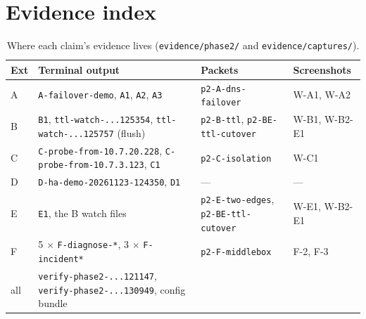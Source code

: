 \documentclass[11pt,a4paper]{article}
\begin{document}
\section{Evidence index}
\begin{table}[H]
\centering
\caption{Where each claim's evidence lives (\texttt{evidence/phase2/} and \texttt{evidence/captures/}).}
{\small
\begin{tabular}{@{}L{0.9cm}L{6.6cm}L{3.6cm}L{2.8cm}@{}}
\toprule
\textbf{Ext} & \textbf{Terminal output} & \textbf{Packets} & \textbf{Screenshots} \\
\midrule
A & \texttt{A-failover-demo}, \texttt{A1}, \texttt{A2}, \texttt{A3} & \texttt{p2-A-dns-failover} & W-A1, W-A2 \\
B & \texttt{B1}, \texttt{ttl-watch-...125354}, \texttt{ttl-watch-...125757} (flush) & \texttt{p2-B-ttl}, \texttt{p2-BE-ttl-cutover} & W-B1, W-B2-E1 \\
C & \texttt{C-probe-from-10.7.20.228}, \texttt{C-probe-from-10.7.3.123}, \texttt{C1} & \texttt{p2-C-isolation} & W-C1 \\
D & \texttt{D-ha-demo-20261123-124350}, \texttt{D1} & --- & --- \\
E & \texttt{E1}, the B watch files & \texttt{p2-E-two-edges}, \texttt{p2-BE-ttl-cutover} & W-E1, W-B2-E1 \\
F & 5 $\times$ \texttt{F-diagnose-*}, 3 $\times$ \texttt{F-incident*} & \texttt{p2-F-middlebox} & F-2, F-3 \\
all & \texttt{verify-phase2-...121147}, \texttt{verify-phase2-...130949}, config bundle & & \\
\bottomrule
\end{tabular}}
\end{table}
\end{document}
